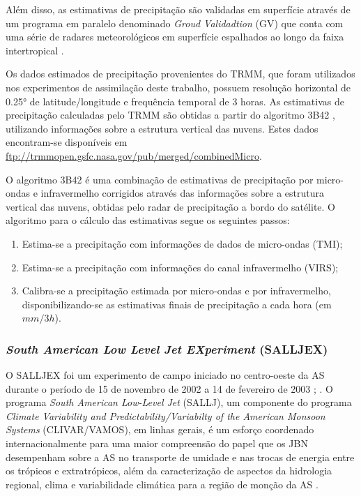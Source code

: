 Além disso, as estimativas de precipitação são validadas em superfície através de um programa em paralelo denominado \textit{Groud Validadtion} (GV) que conta com uma série de radares meteorológicos em superfície espalhados ao longo da faixa intertropical \cite{collischonnetal07}.

Os dados estimados de precipitação provenientes do TRMM, que foram utilizados nos experimentos de assimilação deste trabalho, possuem resolução horizontal de 0.25° de latitude/longitude e frequência temporal de 3 horas. As estimativas de precipitação calculadas pelo TRMM são obtidas a partir do algoritmo 3B42 \cite{huffmanetal07}, utilizando informações sobre a estrutura vertical das nuvens. Estes dados encontram-se disponíveis em \url{ftp://trmmopen.gsfc.nasa.gov/pub/merged/combinedMicro}.
    
O algoritmo 3B42 é uma combinação de estimativas de precipitação por micro-ondas e infravermelho corrigidos através das informações sobre a estrutura vertical das nuvens, obtidas pelo radar de precipitação a bordo do satélite. O algoritmo para o cálculo das estimativas segue os seguintes passos:

\begin{enumerate}
\item Estima-se a precipitação com informações de dados de micro-ondas (TMI);
\item Estima-se a precipitação com informações do canal infravermelho (VIRS);
\item Calibra-se a precipitação estimada por micro-ondas e por infravermelho, disponibilizando-se as estimativas finais de precipitação a cada hora (em $mm/3h$).
\end{enumerate}

\subsubsection{\textit{South American Low Level Jet EXperiment} (SALLJEX)}

O SALLJEX foi um experimento de campo iniciado no centro-oeste da AS durante o período de 15 de novembro de 2002 a 14 de fevereiro de 2003 \cite{vera06}; \cite{herdiesetal07}. O programa \textit{South American Low-Level Jet} (SALLJ), um componente do programa \textit{Climate Variability and Predictability/Variabilty of the American Monsoon Systems} (CLIVAR/VAMOS), em linhas gerais, é um esforço coordenado internacionalmente para uma maior compreensão do papel que os JBN desempenham sobre a AS no transporte de umidade e nas trocas de energia entre os trópicos e extratrópicos, além da caracterização de aspectos da hidrologia regional, clima e variabilidade climática para a região de monção da AS \cite{herdiesetal07}.

